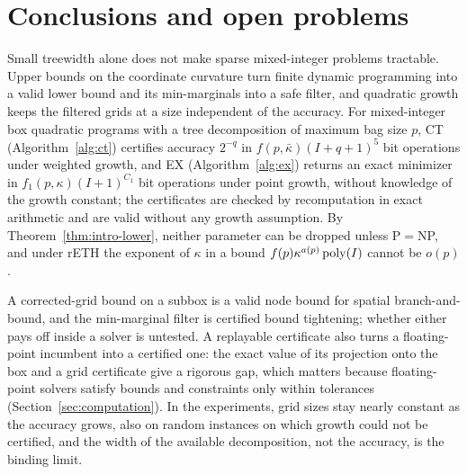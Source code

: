 \section{Conclusions and open problems}\label{sec:conclusion}

Small treewidth alone does not make sparse mixed-integer problems
tractable. Upper bounds on the coordinate curvature turn finite dynamic
programming into a valid lower bound and its min-marginals into a safe
filter, and quadratic growth keeps the filtered grids at a size independent
of the accuracy. For mixed-integer box quadratic programs with a tree
decomposition of maximum bag size $p$, CT (Algorithm~\ref{alg:ct}) certifies
accuracy $2^{-q}$ in $f(p,\bar\kappa)(I+q+1)^5$ bit operations under weighted
growth, and EX (Algorithm~\ref{alg:ex}) returns an exact minimizer in
$f_1(p,\kappa)(I+1)^{C_1}$ bit operations under point growth, without
knowledge of the growth constant; the certificates are checked by
recomputation in exact arithmetic and are valid without any growth
assumption. By Theorem~\ref{thm:intro-lower}, neither parameter can be
dropped unless P${}={}$NP, and under rETH the exponent of $\kappa$ in a bound
$f(p)\kappa^{a(p)}\operatorname{poly}(I)$ cannot be $o(p)$.

A corrected-grid bound on a subbox is a valid node bound for spatial
branch-and-bound, and the min-marginal filter is certified bound tightening;
whether either pays off inside a solver is untested. A replayable certificate
also turns a floating-point incumbent into a certified one: the exact value of
its projection onto the box and a grid certificate give a rigorous gap, which
matters because floating-point solvers satisfy bounds and constraints only
within tolerances (Section~\ref{sec:computation}). In the experiments, grid
sizes stay nearly constant as the accuracy grows, also on random instances
on which growth could not be certified, and the width of the available
decomposition, not the accuracy, is the binding limit.


